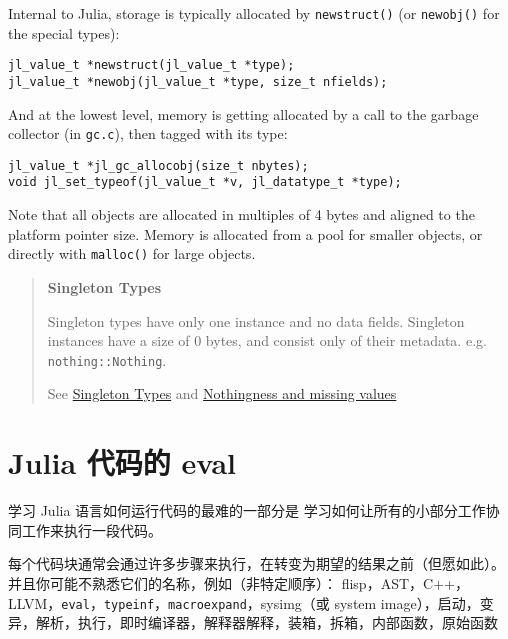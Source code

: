 Internal to Julia, storage is typically allocated by \texttt{newstruct()} (or \texttt{newobj()} for the special types):




\begin{lstlisting}
jl_value_t *newstruct(jl_value_t *type);
jl_value_t *newobj(jl_value_t *type, size_t nfields);
\end{lstlisting}



And at the lowest level, memory is getting allocated by a call to the garbage collector (in \texttt{gc.c}), then tagged with its type:




\begin{lstlisting}
jl_value_t *jl_gc_allocobj(size_t nbytes);
void jl_set_typeof(jl_value_t *v, jl_datatype_t *type);
\end{lstlisting}



Note that all objects are allocated in multiples of 4 bytes and aligned to the platform pointer size. Memory is allocated from a pool for smaller objects, or directly with \texttt{malloc()} for large objects.



\begin{quote}
\textbf{Singleton Types}

Singleton types have only one instance and no data fields. Singleton instances have a size of 0 bytes, and consist only of their metadata. e.g. \texttt{nothing::Nothing}.

See \hyperlink{14008188290941962431}{Singleton Types} and \href{@ref}{Nothingness and missing values}

\end{quote}


\hypertarget{10481677756025410412}{}


\section{Julia 代码的 eval}



学习 Julia 语言如何运行代码的最难的一部分是 学习如何让所有的小部分工作协同工作来执行一段代码。 



每个代码块通常会通过许多步骤来执行，在转变为期望的结果之前（但愿如此）。并且你可能不熟悉它们的名称，例如（非特定顺序）： flisp，AST，C++，LLVM，\texttt{eval}，\texttt{typeinf}，\texttt{macroexpand}，sysimg（或 system image），启动，变异，解析，执行，即时编译器，解释器解释，装箱，拆箱，内部函数，原始函数




